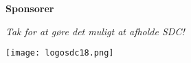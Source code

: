 \cleardoublepage
\begin{titlepage}
	\centering
	\vspace{3cm}
	{\Huge\sffamily\bfseries Sponsorer \par} \vspace{0.5cm}
	{\small\itshape Tak for at gøre det muligt at afholde SDC!\par} \vspace{0.75cm}
	\vfill
	{\centering
		\texttt{[image: logosdc18.png]}\par}
\end{titlepage}